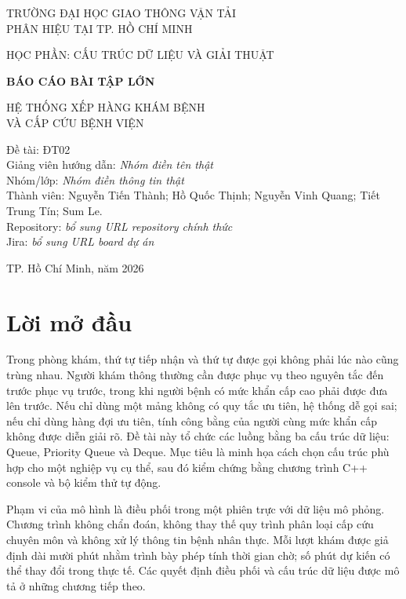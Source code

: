 \documentclass[12pt,a4paper,oneside]{report}
\begin{document}
\begin{titlepage}
\centering
{\Large TRƯỜNG ĐẠI HỌC GIAO THÔNG VẬN TẢI\\ PHÂN HIỆU TẠI TP. HỒ CHÍ MINH\par}
\vspace{1cm}
{\large HỌC PHẦN: CẤU TRÚC DỮ LIỆU VÀ GIẢI THUẬT\par}
\vspace{2cm}
{\Huge\bfseries BÁO CÁO BÀI TẬP LỚN\par}
\vspace{1cm}
{\LARGE HỆ THỐNG XẾP HÀNG KHÁM BỆNH\\ VÀ CẤP CỨU BỆNH VIỆN\par}
\vspace{2cm}
\begin{flushleft}
\large Đề tài: ĐT02\\
Giảng viên hướng dẫn: \textit{Nhóm điền tên thật}\\
Nhóm/lớp: \textit{Nhóm điền thông tin thật}\\
Thành viên: Nguyễn Tiến Thành; Hồ Quốc Thịnh; Nguyễn Vinh Quang; Tiết Trung Tín; Sum Le.\\
Repository: \textit{bổ sung URL repository chính thức}\\
Jira: \textit{bổ sung URL board dự án}
\end{flushleft}
\vfill
{\large TP. Hồ Chí Minh, năm 2026\par}
\end{titlepage}

\chapter*{Lời mở đầu}
Trong phòng khám, thứ tự tiếp nhận và thứ tự được gọi không phải lúc nào cũng trùng nhau. Người khám thông thường cần được phục vụ theo nguyên tắc đến trước phục vụ trước, trong khi người bệnh có mức khẩn cấp cao phải được đưa lên trước. Nếu chỉ dùng một mảng không có quy tắc ưu tiên, hệ thống dễ gọi sai; nếu chỉ dùng hàng đợi ưu tiên, tính công bằng của người cùng mức khẩn cấp không được diễn giải rõ. Đề tài này tổ chức các luồng bằng ba cấu trúc dữ liệu: Queue, Priority Queue và Deque. Mục tiêu là minh họa cách chọn cấu trúc phù hợp cho một nghiệp vụ cụ thể, sau đó kiểm chứng bằng chương trình C++ console và bộ kiểm thử tự động.

Phạm vi của mô hình là điều phối trong một phiên trực với dữ liệu mô phỏng. Chương trình không chẩn đoán, không thay thế quy trình phân loại cấp cứu chuyên môn và không xử lý thông tin bệnh nhân thực. Mỗi lượt khám được giả định dài mười phút nhằm trình bày phép tính thời gian chờ; số phút dự kiến có thể thay đổi trong thực tế. Các quyết định điều phối và cấu trúc dữ liệu được mô tả ở những chương tiếp theo.
\end{document}
